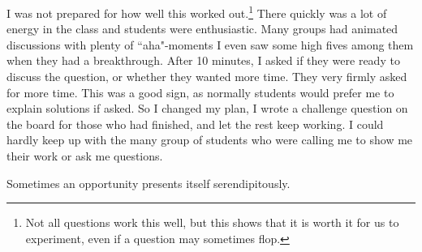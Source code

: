 \documentclass[11pt]{article}
\begin{document}
\begin{example}
\begin{comments}
{I was not prepared for how well this worked out.\footnote{Not all questions work this well, but this shows that it is worth it for us to experiment, even if a question may sometimes flop.}  There quickly was a lot of energy in the class and students were enthusiastic.  Many groups had animated discussions with plenty of ``aha"-moments I even saw some high fives among them when they had a breakthrough.  After 10 minutes, I asked if they were ready to discuss the question, or whether they wanted more time.  They very firmly asked for more time.  This was a good sign, as normally students would prefer me to explain solutions if asked.  So I changed my plan, I wrote a challenge question on the board for those who had finished, and let the rest keep working.  I could hardly keep up with the many group of students who were calling me to show me their work or ask me questions.
}
\end{comments}
\end{example}

\newpage

Sometimes an opportunity presents itself serendipitously.
\end{document}
